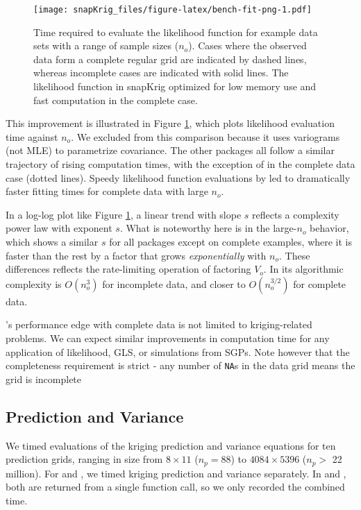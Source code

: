 \begin{figure}
\centering
\texttt{[image: snapKrig\_files/figure-latex/bench-fit-png-1.pdf]}
\caption{\label{fig:bench-fit-png}Time required to evaluate the likelihood function for example data sets with a range of sample sizes (\(n_o\)). Cases where the observed data form a complete regular grid are indicated by dashed lines, whereas incomplete cases are indicated with solid lines. The likelihood function in snapKrig optimized for low memory use and fast computation in the complete case.}
\end{figure}

This improvement is illustrated in Figure \ref{fig:bench-fit-png}, which plots likelihood evaluation time against \(n_o\). We excluded  from this comparison because it uses variograms (not MLE) to parametrize covariance. The other packages all follow a similar trajectory of rising computation times, with the exception of  in the complete data case (dotted lines). Speedy likelihood function evaluations by  led to dramatically faster fitting times for complete data with large \(n_o\).

In a log-log plot like Figure \ref{fig:bench-fit-png}, a linear trend with slope \(s\) reflects a complexity power law with exponent \(s\). What is noteworthy here is in the large-\(n_o\) behavior, which shows a similar \(s\) for all packages except  on complete examples, where it is faster than the rest by a factor that grows \emph{exponentially} with \(n_o\). These differences reflects the rate-limiting operation of factoring \(V_o\). In  its algorithmic complexity is \(O( n_o^3 )\) for incomplete data, and closer to \(O(n_o^{3/2})\) for complete data.

's performance edge with complete data is not limited to kriging-related problems. We can expect similar improvements in computation time for any application of likelihood, GLS, or simulations from SGPs. Note however that the completeness requirement is strict - any number of \texttt{NA}s in the data grid means the grid is incomplete

\hypertarget{prediction-and-variance}{%
\subsection{Prediction and Variance}\label{prediction-and-variance}}

We timed evaluations of the kriging prediction and variance equations for ten prediction grids, ranging in size from \(8 \times 11\) (\(n_p=88\)) to \(4084 \times 5396\) (\(n_p>\) 22 million). For  and , we timed kriging prediction and variance separately. In  and , both are returned from a single function call, so we only recorded the combined time.

